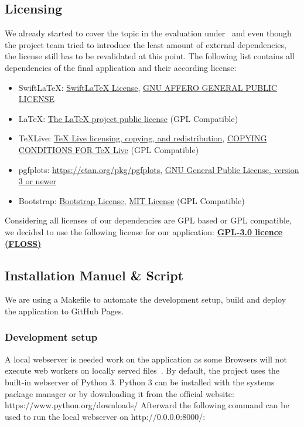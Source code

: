 \subsection{Licensing}\label{subsec:licensing}
We already started to cover the topic in the evaluation under~ and even though the project team tried to introduce the least amount of external dependencies,
the license still has to be revalidated at this point.
The following list contains all dependencies of the final application and their according license:
\begin{itemize}
    \item SwiftLaTeX: \href{https://github.com/SwiftLaTeX/SwiftLaTeX/blob/master/LICENSE}{SwiftLaTeX License}, \href{https://www.gnu.org/licenses/agpl-3.0.en.html}{GNU AFFERO GENERAL PUBLIC LICENSE}
    \item LaTeX: \href{https://www.latex-project.org/lppl.txt}{The LaTeX project public license} (GPL Compatible)
    \item TeXLive: \href{https://www.tug.org/texlive/copying.html}{TeX Live licensing, copying, and redistribution}, \href{https://www.tug.org/texlive/LICENSE.TL}{COPYING CONDITIONS FOR TeX Live} (GPL Compatible)
    \item pgfplots: \href{https://ctan.org/pkg/pgfplots}{https://ctan.org/pkg/pgfplots}, \href{https://www.gnu.org/licenses/gpl-3.0.en.html}{GNU General Public License, version 3 or newer}
    \item Bootstrap: \href{https://github.com/twbs/bootstrap/blob/main/LICENSE}{Bootstrap License}, \href{https://en.wikipedia.org/wiki/MIT_License}{MIT License} (GPL Compatible)
\end{itemize}

Considering all licenses of our dependencies are GPL based or GPL compatible,
we decided to use the following license for our application: \textbf{\href{https://www.gnu.org/licenses/gpl-3.0.en.html}{GPL-3.0 licence (FLOSS)}}

\subsection{Installation Manuel \& Script}\label{subsec:installation-manuel-and-script}
We are using a Makefile to automate the development setup, build and deploy the application to GitHub Pages.

\subsubsection{Development setup}\label{subsubsec:deployment-setup}
A local webserver is needed work on the application as some Browsers will not execute web workers on locally served files~\cite{stackoverflow_chrome_cant_load_web_worker}.
By default, the project uses the built-in webserver of Python 3.
Python 3 can be installed with the systems package manager or by downloading it from the official website: https://www.python.org/downloads/
Afterward the following command can be used to run the local webserver on http://0.0.0.0:8000/:

